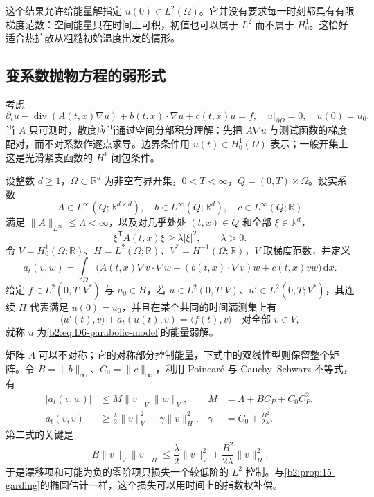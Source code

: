 这个结果允许给能量解指定 \(u(0)\in L^2(\Omega)\)。它并没有要求每一时刻都具有有限梯度范数：空间能量只在时间上可积，初值也可以属于 \(L^2\) 而不属于 \(H_0^1\)。这恰好适合热扩散从粗糙初始温度出发的情形。

\subsection{变系数抛物方程的弱形式}
\label{b2:subsec:D20602}

考虑
\begin{equation}\label{b2:eq:D6-parabolic-model}
 \partial_tu-\operatorname{div}(A(t,x)\nabla u)
       +b(t,x)\cdot\nabla u+c(t,x)u=f,
 \quad u|_{\partial\Omega}=0,\quad u(0)=u_0.
\end{equation}
当 \(A\) 只可测时，散度应当通过空间分部积分理解：先把 \(A\nabla u\) 与测试函数的梯度配对，而不对系数作逐点求导。边界条件用 \(u(t)\in H_0^1(\Omega)\) 表示；一般开集上这是光滑紧支函数的 \(H^1\) 闭包条件。

\begin{definition}[线性抛物方程的能量弱解]\label{b2:def:D6-weak-solution}
设整数 \(d\geq1\)，\(\Omega\subset\mathbb R^d\) 为非空有界开集，\(0<T<\infty\)，\(Q=(0,T)\times\Omega\)。设实系数
\[
 A\in L^\infty(Q;\mathbb R^{d\times d}),\quad
 b\in L^\infty(Q;\mathbb R^d),\quad c\in L^\infty(Q;\mathbb R)
\]
满足 \(\|A\|_{L^\infty}\leq\Lambda<\infty\)，以及对几乎处处 \((t,x)\in Q\) 和全部 \(\xi\in\mathbb R^d\)，
\[
 \xi^{\mathsf T}A(t,x)\xi\geq\lambda|\xi|^2,\qquad\lambda>0.
\]
令 \(V=H_0^1(\Omega;\mathbb R)\)、\(H=L^2(\Omega;\mathbb R)\)、\(V^*=H^{-1}(\Omega;\mathbb R)\)，\(V\) 取梯度范数，并定义
\[
 a_t(v,w)=\int_\Omega\bigl(A(t,x)\nabla v\cdot\nabla w
                  +(b(t,x)\cdot\nabla v)w+c(t,x)vw\bigr)\,\mathrm dx.
\]
给定 \(f\in L^2(0,T;V^*)\) 与 \(u_0\in H\)，若 \(u\in L^2(0,T;V)\)、\(u'\in L^2(0,T;V^*)\)，其连续 \(H\) 代表满足 \(u(0)=u_0\)，并且在某个共同的时间满测集上有
\[
 \langle u'(t),v\rangle+a_t(u(t),v)=\langle f(t),v\rangle
 \quad\text{对全部 }v\in V,
\]
就称 \(u\) 为\eqref{b2:eq:D6-parabolic-model}的能量弱解。
\end{definition}

矩阵 \(A\) 可以不对称；它的对称部分控制能量，下式中的双线性型则保留整个矩阵。令 \(B=\|b\|_\infty\)、\(C_0=\|c\|_\infty\)，利用 Poincaré 与 Cauchy--Schwarz 不等式，有
\begin{equation}\label{b2:eq:D6-form-bounds}
 \begin{aligned}
 |a_t(v,w)|&\leq M\|v\|_V\|w\|_V,
       &M&=\Lambda+BC_P+C_0C_P^2,\\
 a_t(v,v)&\geq\frac\lambda2\|v\|_V^2-\gamma\|v\|_H^2,
       &\gamma&=C_0+\frac{B^2}{2\lambda}.
 \end{aligned}
\end{equation}
第二式的关键是
\[
 B\|v\|_V\|v\|_H
 \leq\frac\lambda2\|v\|_V^2+\frac{B^2}{2\lambda}\|v\|_H^2.
\]
于是漂移项和可能为负的零阶项只损失一个较低阶的 \(L^2\) 控制。与\cref{b2:prop:15-garding}的椭圆估计一样，这个损失可以用时间上的指数权补偿。

